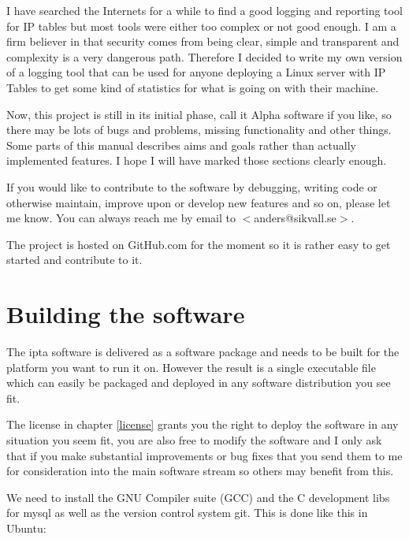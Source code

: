 \documentclass[10pt,a4paper]{report}
\begin{document}
I have searched the Internets for a while to find a good logging and reporting tool for IP tables but most tools were either too complex or not good enough. I am a firm believer in that security comes from being clear, simple and transparent and complexity is a very dangerous path. Therefore I decided to write my own version of a logging tool that can be used for anyone deploying a Linux server with IP Tables to get some kind of statistics for what is going on with their machine. 
 
Now, this project is still in its initial phase, call it Alpha software if you like, so there may be lots of bugs and problems, missing functionality and other things. Some parts of this manual describes aims and goals rather than actually implemented features. I hope I will have marked those sections clearly enough. 

If you would like to contribute to the software by debugging, writing code or otherwise maintain, improve upon or develop new features and so on, please let me know. You can always reach me by email to $<$anders@sikvall.se$>$.

The project is hosted on GitHub.com for the moment so it is rather easy to get started and contribute to it.











\chapter{Building the software}

The ipta software is delivered as a software package and needs to be built for the platform you want to run it on. However the result is a single executable file which can easily be packaged and deployed in any software distribution you see fit. 

The license in chapter \ref{license} grants you the right to deploy the software in any situation you seem fit, you are also free to modify the software and I only ask that if you make substantial improvements or bug fixes that you send them to me for consideration into the main software stream so others may benefit from this.

We need to install the GNU Compiler suite (GCC) and the C development libs for mysql as well as the version control system git. This is done like this in Ubuntu:
\end{document}
